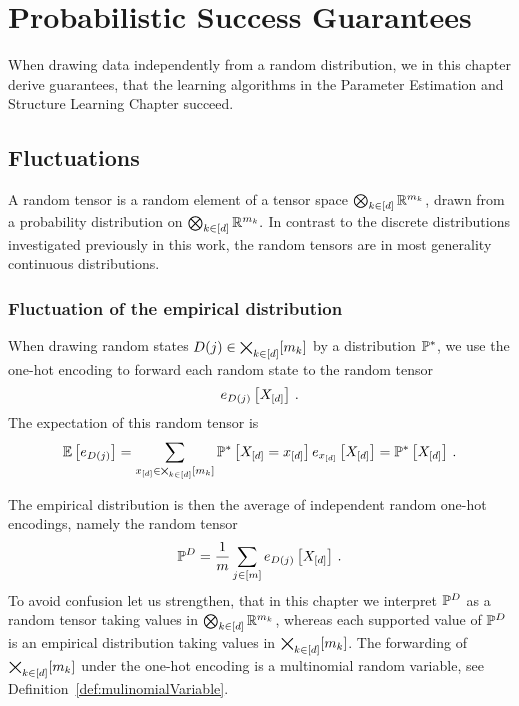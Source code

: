 \section{Probabilistic Success Guarantees}\label{cha:mlnConcentration}

When drawing data independently from a random distribution, we in this chapter derive guarantees, that the learning algorithms in the Parameter Estimation and Structure Learning Chapter succeed.

%
	
	
\subsection{Fluctuations}

A random tensor is a random element of a tensor space $\bigotimes_{k\in[d]} \mathbb{R}^{m_{k}}$, drawn from a probability distribution on $\bigotimes_{k\in[d]} \mathbb{R}^{m_{k}}.$
In contrast to the discrete distributions investigated previously in this work, the random tensors are in most generality continuous distributions. %

\subsubsection{Fluctuation of the empirical distribution}

When drawing random states $D(j)\in\bigtimes_{k\in[d]}[m_{k}]$ by a distribution $\mathbb{P}^*$, we use the one-hot encoding to forward each random state to the random tensor
	\[ e_{D(j)}\left[X_{[d]}\right] \, . \]
The expectation of this random tensor is
\begin{align*}
	\mathbb{E}\left[e_{D(j)}\right] 
	= \sum_{x_{[d]}\in\bigtimes_{k\in[d]}[m_{k}]} \mathbb{P}^*\left[X_{[d]}=x_{[d]}\right] e_{x_{[d]}}\left[X_{[d]}\right] 
	= \mathbb{P}^*\left[X_{[d]}\right] \, . 
\end{align*}
	
The empirical distribution is then the average of independent random one-hot encodings, namely the random tensor
	\[ \mathbb{P}^{D} = \frac{1}{m} \sum_{j\in[m]}  e_{D(j)}\left[X_{[d]}\right] \, . \]
To avoid confusion let us strengthen, that in this chapter we interpret $\mathbb{P}^{D}$ as a random tensor taking values in $\bigotimes_{k\in[d]} \mathbb{R}^{m_{k}}$, whereas each supported value of $\mathbb{P}^{D}$ is an empirical distribution taking values in $\bigtimes_{k\in[d]}[m_{k}]$.
The forwarding of $\bigtimes_{k\in[d]}[m_{k}]$ under the one-hot encoding is a multinomial random variable, see Definition~\ref{def:mulinomialVariable}.


